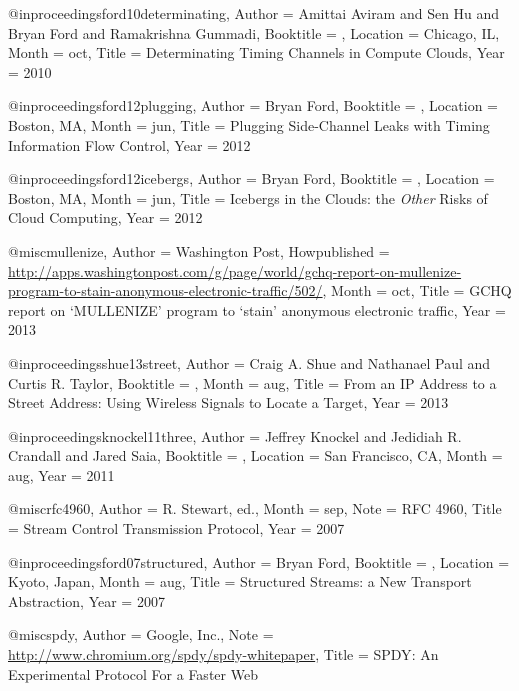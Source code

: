{{{{{{{	@inproceedings{ford10determinating,
	Author = {Amittai Aviram and Sen Hu and Bryan Ford and Ramakrishna Gummadi},
	Booktitle = {},
	Location = {Chicago, IL},
	Month = oct,
	Title = {Determinating Timing Channels in Compute Clouds},
	Year = 2010}
	
	@inproceedings{ford12plugging,
	Author = {Bryan Ford},
	Booktitle = {},
	Location = {Boston, MA},
	Month = jun,
	Title = {Plugging Side-Channel Leaks with Timing Information Flow Control},
	Year = 2012}
	
	@inproceedings{ford12icebergs,
	Author = {Bryan Ford},
	Booktitle = {},
	Location = {Boston, MA},
	Month = jun,
	Title = {Icebergs in the Clouds: the {\em Other} Risks of Cloud Computing},
	Year = 2012}
	
	@misc{mullenize,
	Author = {Washington Post},
	Howpublished = {\url{http://apps.washingtonpost.com/g/page/world/gchq-report-on-mullenize-program-to-stain-anonymous-electronic-traffic/502/}},
	Month = {oct},
	Title = {{GCHQ} report on {`MULLENIZE'} program to `stain' anonymous electronic traffic},
	Year = {2013}}
	
	@inproceedings{shue13street,
	Author = {Craig A. Shue and Nathanael Paul and Curtis R. Taylor},
	Booktitle = {},
	Month = aug,
	Title = {From an {IP} Address to a Street Address: Using Wireless Signals to Locate a Target},
	Year = 2013}
	
	@inproceedings{knockel11three,
	Author = {Jeffrey Knockel and Jedidiah R. Crandall and Jared Saia},
	Booktitle = {},
	Location = {San Francisco, CA},
	Month = aug,
	Year = 2011}
	
	@misc{rfc4960,
	Author = {R. {Stewart, ed.}},
	Month = sep,
	Note = {RFC 4960},
	Title = {Stream Control Transmission Protocol},
	Year = 2007}
	
	@inproceedings{ford07structured,
	Author = {Bryan Ford},
	Booktitle = {},
	Location = {Kyoto, Japan},
	Month = aug,
	Title = {Structured Streams: a New Transport Abstraction},
	Year = {2007}}
	
	@misc{spdy,
	Author = {Google, Inc.},
	Note = {\url{http://www.chromium.org/spdy/spdy-whitepaper}},
	Title = {{SPDY}: An Experimental Protocol For a Faster {Web}}}
	
}}}}}}}

